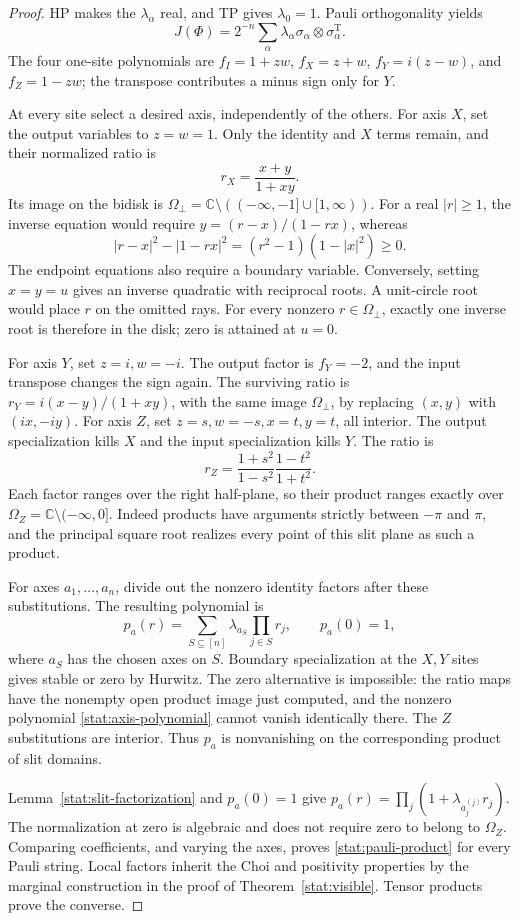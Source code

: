\documentclass[reqno]{amsart}
\theoremstyle{definition}
\theoremstyle{remark}
\newcommand{\C}{\mathbb C}
\begin{document}
\begin{proof}
HP makes the \(\lambda_\alpha\) real, and TP gives
\(\lambda_0=1\).  Pauli orthogonality yields
\[
 J(\Phi)=2^{-n}\sum_\alpha\lambda_\alpha
                 \sigma_\alpha\otimes\sigma_\alpha^{\mathrm T}.
\]
The four one-site polynomials are
\(f_I=1+zw\), \(f_X=z+w\), \(f_Y=i(z-w)\),
and \(f_Z=1-zw\); the transpose contributes a minus sign
only for \(Y\).

At every site select a desired axis, independently of the others.
For axis \(X\), set the output variables to \(z=w=1\).
Only the identity and \(X\) terms remain, and their normalized
ratio is
\[
 r_X=\frac{x+y}{1+xy}.
\]
Its image on the bidisk is
\(\Omega_\perp=\C\setminus(({-\infty},-1]\cup[1,\infty))\).
For a real \(|r|\ge1\), the inverse equation would require
\(y=(r-x)/(1-rx)\), whereas
\[
 |r-x|^2-|1-rx|^2=(r^2-1)(1-|x|^2)\ge0.
\]
The endpoint equations also require a boundary variable.
Conversely, setting \(x=y=u\) gives an inverse quadratic with
reciprocal roots.  A unit-circle root would place \(r\) on
the omitted rays.  For every nonzero \(r\in\Omega_\perp\),
exactly one inverse root is therefore in the disk; zero is
attained at \(u=0\).

For axis \(Y\), set \(z=i,w=-i\).  The output factor is
\(f_Y=-2\), and the input transpose changes the sign again.
The surviving ratio is
\(r_Y=i(x-y)/(1+xy)\), with the same image
\(\Omega_\perp\), by replacing \((x,y)\) with \((ix,-iy)\).
For axis \(Z\), set \(z=s,w=-s,x=t,y=t\), all interior.
The output specialization kills \(X\) and the input
specialization kills \(Y\).  The ratio is
\[
 r_Z=\frac{1+s^2}{1-s^2}\frac{1-t^2}{1+t^2}.
\]
Each factor ranges over the right half-plane, so their product
ranges exactly over \(\Omega_Z=\C\setminus(-\infty,0]\).
Indeed products have arguments strictly between \(-\pi\) and
\(\pi\), and the principal square root realizes every point
of this slit plane as such a product.

For axes \(a_1,\ldots,a_n\), divide out the nonzero identity
factors after these substitutions.  The resulting polynomial is
\begin{equation}
 p_a(r)=\sum_{S\subseteq[n]}\lambda_{a_S}\prod_{j\in S}r_j,
 \qquad p_a(0)=1,
 \label{stat:axis-polynomial}
\end{equation}
where \(a_S\) has the chosen axes on \(S\).
Boundary specialization at the \(X,Y\) sites gives stable or
zero by Hurwitz.  The zero alternative is impossible: the
ratio maps have the nonempty open product image just computed,
and the nonzero polynomial \eqref{stat:axis-polynomial} cannot
vanish identically there.  The \(Z\) substitutions are interior.
Thus \(p_a\) is nonvanishing on the corresponding product of
slit domains.

Lemma~\ref{stat:slit-factorization} and \(p_a(0)=1\) give
\(p_a(r)=\prod_j(1+\lambda_{a_j^{(j)}}r_j)\).
The normalization at zero is algebraic and does not require
zero to belong to \(\Omega_Z\).  Comparing coefficients, and
varying the axes, proves \eqref{stat:pauli-product} for every
Pauli string.  Local factors inherit the Choi and positivity
properties by the marginal construction in the proof of
Theorem~\ref{stat:visible}.  Tensor products prove the converse.
\end{proof}
\end{document}
